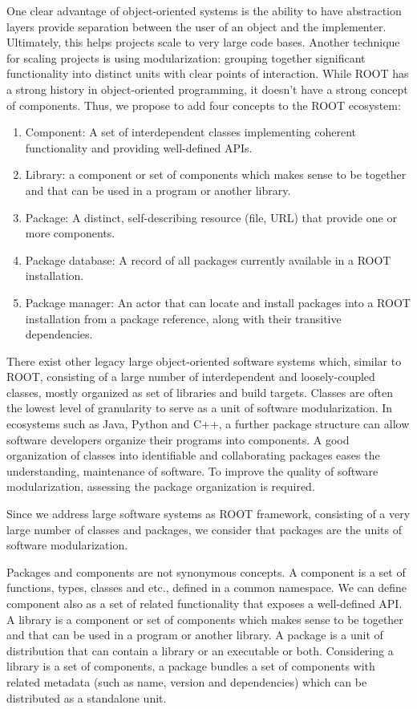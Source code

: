 \documentclass{webofc}
\begin{document}
One clear advantage of object-oriented systems is the ability to have abstraction layers provide separation between the user of an object and the implementer. Ultimately, this helps projects scale to very large code bases. Another technique for scaling projects is using modularization: grouping together significant functionality into distinct units with clear points of interaction.  While ROOT has a strong history in object-oriented programming, it doesn’t have a strong concept of components.  Thus, we propose to add four concepts to the ROOT ecosystem:
\begin{enumerate}
\item Component: A set of interdependent classes implementing coherent functionality and providing well-defined APIs.
\item Library: a component or set of components  which makes sense to be together and that can be used in a program or another library.
\item Package: A distinct, self-describing resource (file, URL) that provide one or more components.
\item Package database: A record of all packages currently available in a ROOT installation.
\item Package manager: An actor that can locate and install packages into a ROOT installation from a package reference, along with their transitive dependencies.
\end{enumerate}
There exist other legacy large object-oriented software systems  which, similar to ROOT, consisting of a large number of interdependent  and loosely-coupled classes, mostly organized as set of libraries and build targets.  Classes are often the lowest level of granularity to serve as a unit of software modularization. In ecosystems such as Java, Python and C++, a further package structure can allow software developers organize their programs into components. A good organization of classes into identifiable and collaborating packages eases the understanding, maintenance of software. To improve the quality of software modularization, assessing the package organization is required.

Since we address large software systems as ROOT framework, consisting of a very large number of classes and packages, we consider that packages are the units of software modularization. 

Packages and components are not synonymous concepts.  A component is a set of functions, types, classes and etc., defined in a common namespace. We can define component also as a set of related functionality that exposes a well-defined API. A library is a component or set of components  which makes sense to be together and that can be used in a program or another library. A package is a unit of distribution that can contain a library or an executable or both. Considering a library is a set of components, a package bundles a set of components with related metadata (such as name, version and dependencies) which can be distributed as a standalone unit.
\end{document}
